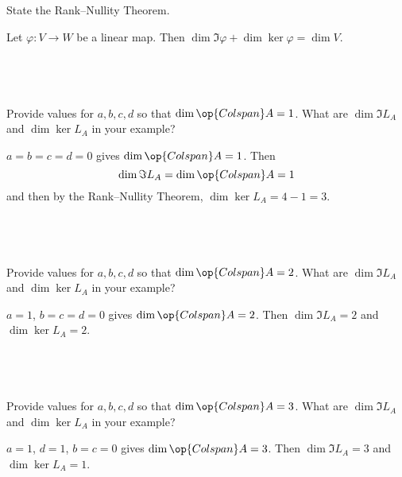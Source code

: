 \documentclass[a4paper]{article}
\begin{document}
\subsection{~} %

\begin{questionbody}
State the Rank--Nullity Theorem. %
\end{questionbody}

Let $\varphi \colon V \to W$ be a linear map. Then $\dim \Im \varphi + \dim \ker \varphi = \dim V$.

\subsection{~} %

\begin{questionbody}
Provide values for $a, b, c, d$ so that $\dim \op{Colspan} A = 1$. What are $\dim \Im L_A$ and $\dim \ker L_A$ in your example?
\end{questionbody}

$a = b = c = d = 0$ gives $\dim \op{Colspan} A = 1$. Then \[
\dim \Im L_A = \dim \op{Colspan} A = 1
\] and then by the Rank--Nullity Theorem, $\dim \ker L_A = 4 - 1 = 3$. %

\subsection{~} %

\begin{questionbody}
Provide values for $a, b, c, d$ so that $\dim \op{Colspan} A = 2$. What are $\dim \Im L_A$ and $\dim \ker L_A$ in your example?
\end{questionbody}

$a = 1$, $b = c = d = 0$ gives $\dim \op{Colspan} A = 2$. Then $\dim \Im L_A = 2$ and $\dim \ker L_A = 2$.

\subsection{~} %

\begin{questionbody}
Provide values for $a, b, c, d$ so that $\dim \op{Colspan} A = 3$. What are $\dim \Im L_A$ and $\dim \ker L_A$ in your example?
\end{questionbody}

$a = 1$, $d = 1$, $b = c = 0$ gives $\dim \op{Colspan} A = 3$. Then $\dim \Im L_A = 3$ and $\dim \ker L_A = 1$.

\end{document}
